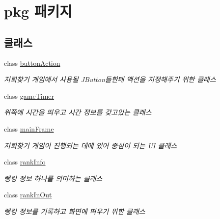 \hypertarget{namespacepkg}{}\section{pkg 패키지}
\label{namespacepkg}
\subsection*{클래스}
\begin{DoxyCompactItemize}
\item 
class \hyperlink{classpkg_1_1button_action}{button\+Action}
\begin{DoxyCompactList}\small\item\em 지뢰찾기 게임에서 사용될 J\+Button들한테 액션을 지정해주기 위한 클래스 \end{DoxyCompactList}\item 
class \hyperlink{classpkg_1_1game_timer}{game\+Timer}
\begin{DoxyCompactList}\small\item\em 위쪽에 시간을 띄우고 시간 정보를 갖고있는 클래스 \end{DoxyCompactList}\item 
class \hyperlink{classpkg_1_1main_frame}{main\+Frame}
\begin{DoxyCompactList}\small\item\em 지뢰찾기 게임이 진행되는 데에 있어 중심이 되는 UI 클래스 \end{DoxyCompactList}\item 
class \hyperlink{classpkg_1_1rank_info}{rank\+Info}
\begin{DoxyCompactList}\small\item\em 랭킹 정보 하나를 의미하는 클래스 \end{DoxyCompactList}\item 
class \hyperlink{classpkg_1_1rank_in_out}{rank\+In\+Out}
\begin{DoxyCompactList}\small\item\em 랭킹 정보를 기록하고 화면에 띄우기 위한 클래스 \end{DoxyCompactList}\end{DoxyCompactItemize}
